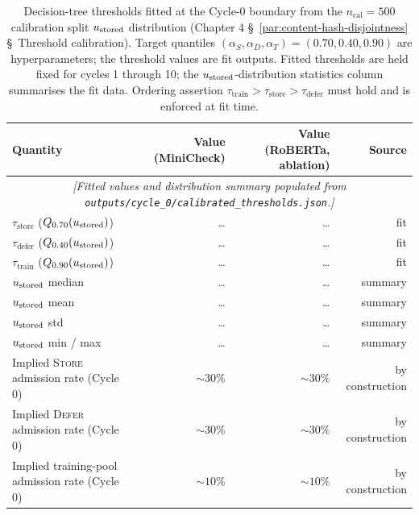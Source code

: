 \begin{table}[t]
\centering
\caption{Decision-tree thresholds fitted at the Cycle-0 boundary
from the $n_{\text{cal}} = 500$ calibration split
$u_{\text{stored}}$ distribution (Chapter 4
\S~\ref{par:content-hash-disjointness}
\S~Threshold calibration). Target quantiles $(\alpha_S, \alpha_D, \alpha_T) = (0.70, 0.40, 0.90)$ are
hyperparameters; the threshold values are fit outputs. Fitted
thresholds are held fixed for cycles 1 through 10; the
$u_{\text{stored}}$-distribution statistics column summarises the fit
data. Ordering assertion $\tau_{\text{train}} > \tau_{\text{store}} > \tau_{\text{defer}}$
must hold and is enforced at fit time.}
\label{tab:fitted-thresholds}
\small
\begin{tabular}{lrrr}
\toprule
Quantity & Value (MiniCheck) & Value (RoBERTa, ablation) & Source \\
\midrule
\multicolumn{4}{c}{\emph{[Fitted values and distribution summary populated from \texttt{outputs/cycle\_0/calibrated\_thresholds.json}.]}}\\
$\tau_{\text{store}}$ ($Q_{0.70}(u_{\text{stored}})$) & \ldots & \ldots & fit \\
$\tau_{\text{defer}}$ ($Q_{0.40}(u_{\text{stored}})$) & \ldots & \ldots & fit \\
$\tau_{\text{train}}$ ($Q_{0.90}(u_{\text{stored}})$) & \ldots & \ldots & fit \\
\midrule
$u_{\text{stored}}$ median & \ldots & \ldots & summary \\
$u_{\text{stored}}$ mean & \ldots & \ldots & summary \\
$u_{\text{stored}}$ std & \ldots & \ldots & summary \\
$u_{\text{stored}}$ min / max & \ldots & \ldots & summary \\
\midrule
Implied \textsc{Store} admission rate (Cycle 0) & $\sim 30\%$ & $\sim 30\%$ & by construction \\
Implied \textsc{Defer} admission rate (Cycle 0) & $\sim 30\%$ & $\sim 30\%$ & by construction \\
Implied training-pool admission rate (Cycle 0) & $\sim 10\%$ & $\sim 10\%$ & by construction \\
\bottomrule
\end{tabular}
\end{table}


